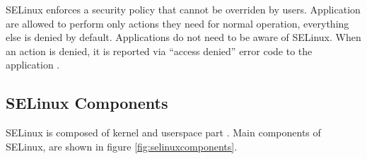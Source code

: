 SELinux enforces a security policy that cannot be overriden by users.
Application are allowed to perform only actions they need for normal operation,
everything else is denied by default. Applications do not need to be aware of
SELinux. When an action is denied, it is reported via ``access denied'' error
code to the application \cite{centoshowto}.

%
%    
%
%

\subsection{SELinux Components}
SELinux is composed of kernel and userspace part \cite[pp.~19--22]{tsn}. Main
components of SELinux, are shown in figure \ref{fig:selinuxcomponents}.

